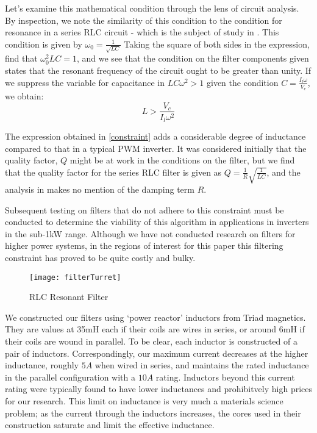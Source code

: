 Let's examine this mathematical condition through the lens of circuit analysis. By inspection, we note the similarity of this condition to the condition for resonance in a series RLC circuit - which is the subject of study in \cite{ricardo}. This condition is given by $\omega_0 = \frac{1}{\sqrt{LC}}$ Taking the square of both sides in the expression, find that $\omega_0^2LC=1$, and we see that the condition on the filter components given states that the resonant frequency of the circuit ought to be greater than unity. If we suppress the variable for capacitance in 
$LC\omega^2>1$ given the condition $C=\frac{I_l\omega}{V_c}$, we obtain:
\begin{equation}
\label{constraint}
L > \frac{V_c}{I_l\omega^2}
\end{equation}

The expression obtained in \ref{constraint} adds a considerable degree of inductance compared to that in a typical PWM inverter. It was considered initially that the quality factor, $Q$ might be at work in the conditions on the filter, but we find that the quality factor for the series RLC filter is given as $Q = \frac{1}{R}\sqrt{\frac{1}{LC}}$, and the analysis in \cite{ricardo} makes no mention of the damping term $R$. 

Subsequent testing on filters that do not adhere to this constraint must be conducted to determine the viability of this algorithm in applications in inverters in the sub-1kW range. Although we have not conducted research on filters for higher power systems, in the regions of interest for this paper this filtering constraint has proved to be quite costly and bulky. 

\begin{figure}[h]
\centering
\texttt{[image: filterTurret]}
\caption{RLC Resonant Filter}
\label{filterTurret}
\end{figure}

We constructed our filters using `power reactor' inductors from Triad magnetics. They are values at 35mH each if their coils are wires in series, or around 6mH if their coils are wound in parallel. To be clear, each inductor is constructed of a pair of inductors. Correspondingly, our maximum current decreases at the higher inductance, roughly $5A$ when wired in series, and maintains the rated inductance in the parallel configuration with a $10A$ rating. Inductors beyond this current rating were typically found to have lower inductances and prohibitvely high prices for our research. This limit on inductance is very much a materials science problem; as the current through the inductors increases, the cores used in their construction saturate and limit the effective inductance. 

